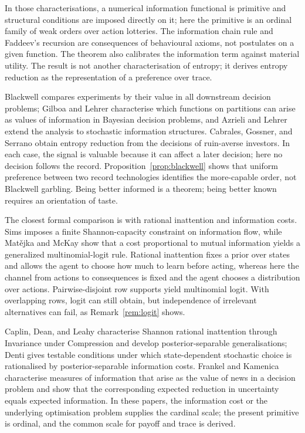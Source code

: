 \documentclass[11pt,a4paper]{article}
\theoremstyle{definition}
\newcommand{\1}{\mathbf 1}
\begin{document}
In those characterisations, a numerical information functional is primitive and structural conditions are
imposed directly on it; here the primitive is an ordinal family of weak orders over action lotteries.  The
information chain rule and Faddeev's recursion are consequences of behavioural axioms, not postulates on a given
function.  The theorem also calibrates the information term against material utility.  The result is not another
characterisation of entropy; it derives entropy reduction as the representation of a preference over trace.

Blackwell \cite{Blackwell1953} compares experiments by their value in all downstream decision problems; Gilboa
and Lehrer \cite{GilboaLehrer1991} characterise which functions on partitions can arise as values of information
in Bayesian decision problems, and Azrieli and Lehrer \cite{AzrieliLehrer2008} extend the analysis to stochastic
information structures.  Cabrales, Gossner, and Serrano \cite{CabralesGossnerSerrano2013} obtain entropy
reduction from the decisions of ruin-averse investors.  In each case, the signal is valuable because it can
affect a later decision; here no decision follows the record.  Proposition~\ref{prop:blackwell} shows that
uniform preference between two record technologies identifies the more-capable order, not Blackwell garbling.
Being better informed is a theorem; being better known requires an orientation of taste.

The closest formal comparison is with rational inattention and information costs.  Sims \cite{Sims2003} imposes
a finite Shannon-capacity constraint on information flow, while Mat\v{e}jka and McKay
\cite{MatejkaMcKay2015} show that a cost proportional to mutual information yields a generalized
multinomial-logit rule.  Rational inattention fixes a prior over states and allows the agent to choose how much
to learn before acting, whereas here the channel from actions to consequences is fixed and the agent chooses a
distribution over actions.  Pairwise-disjoint row supports yield multinomial logit.  With overlapping rows,
logit can still obtain, but independence of irrelevant alternatives can fail, as Remark~\ref{rem:logit} shows.

Caplin, Dean, and Leahy \cite{CaplinDeanLeahy2022} characterise Shannon rational inattention through Invariance
under Compression and develop posterior-separable generalisations; Denti \cite{Denti2022} gives testable
conditions under which state-dependent stochastic choice is rationalised by posterior-separable information
costs.  Frankel and Kamenica \cite{FrankelKamenica2019} characterise measures of information that arise as the
value of news in a decision problem and show that the corresponding expected reduction in uncertainty equals
expected information.  In these papers, the information cost or the underlying optimisation problem supplies
the cardinal scale; the present primitive is ordinal, and the common scale for payoff and trace is derived.
\end{document}
